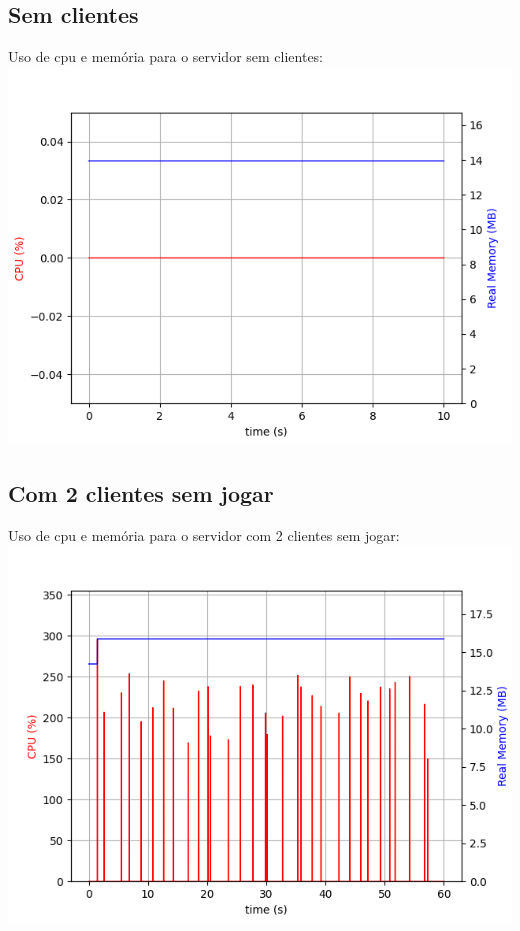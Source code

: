 \documentclass[12pt]{beamer}
\begin{document}
\subsection{Sem clientes}
\begin{frame}
  Uso de cpu e memória para o servidor sem clientes:
  \includegraphics[scale=0.6]{./servidorsolo.png}
\end{frame}
\subsection{Com 2 clientes sem jogar}
\begin{frame}
  Uso de cpu e memória para o servidor com 2 clientes sem jogar:
  \includegraphics[scale=0.6]{./servidorsemjogar.png}
\end{frame}
\end{document}
